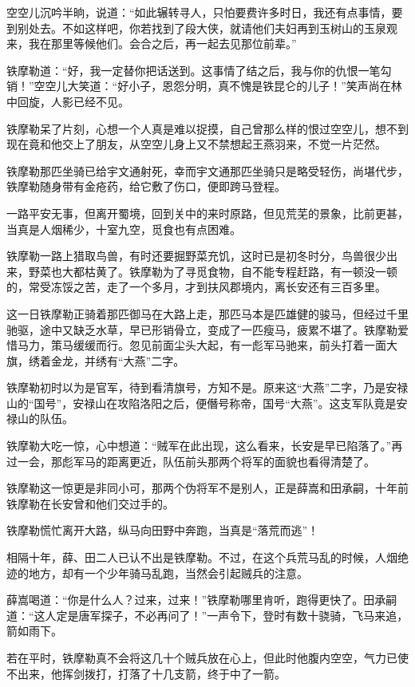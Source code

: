 \documentclass[12pt,oneside]{book}
\begin{document}
空空儿沉吟半晌，说道：``如此辗转寻人，只怕要费许多时日，我还有点事情，要到别处去。不如这样吧，你若找到了段大侠，就请他们夫妇再到玉树山的玉泉观来，我在那里等候他们。会合之后，再一起去见那位前辈。''

铁摩勒道：``好，我一定替你把话送到。这事情了结之后，我与你的仇恨一笔勾销！''空空儿大笑道：``好小子，恩怨分明，真不愧是铁昆仑的儿子！''笑声尚在林中回旋，人影已经不见。

铁摩勒呆了片刻，心想一个人真是难以捉摸，自己曾那么样的恨过空空儿，想不到现在竟和他交上了朋友，从空空儿身上又不禁想起王燕羽来，不觉一片茫然。

铁摩勒那匹坐骑已给宇文通射死，幸而宇文通那匹坐骑只是略受轻伤，尚堪代步，铁摩勒随身带有金疮药，给它敷了伤口，便即跨马登程。

一路平安无事，但离开蜀境，回到关中的来时原路，但见荒芜的景象，比前更甚，当真是人烟稀少，十室九空，觅食也有点困难。

铁摩勒一路上猎取鸟兽，有时还要掘野菜充饥，这时已是初冬时分，鸟兽很少出来，野菜也大都枯黄了。铁摩勒为了寻觅食物，自不能专程赶路，有一顿没一顿的，常受冻馁之苦，走了一个多月，才到扶风郡境内，离长安还有三百多里。

这一日铁摩勒正骑着那匹御马在大路上走，那匹马本是匹雄健的骏马，但经过千里驰驱，途中又缺乏水草，早已形销骨立，变成了一匹瘦马，疲累不堪了。铁摩勒爱惜马力，策马缓缓而行。忽见前面尘头大起，有一彪军马驰来，前头打着一面大旗，绣着金龙，并绣有``大燕''二字。

铁摩勒初时以为是官军，待到看清旗号，方知不是。原来这``大燕''二字，乃是安禄山的``国号''，安禄山在攻陷洛阳之后，便僭号称帝，国号``大燕''。这支军队竟是安禄山的队伍。

铁摩勒大吃一惊，心中想道：``贼军在此出现，这么看来，长安是早已陷落了。''再过一会，那彪军马的距离更近，队伍前头那两个将军的面貌也看得清楚了。

铁摩勒这一惊更是非同小可，那两个伪将军不是别人，正是薛嵩和田承嗣，十年前铁摩勒在长安曾和他们交过手的。

铁摩勒慌忙离开大路，纵马向田野中奔跑，当真是``落荒而逃''！

相隔十年，薛、田二人已认不出是铁摩勒。不过，在这个兵荒马乱的时候，人烟绝迹的地方，却有一个少年骑马乱跑，当然会引起贼兵的注意。

薛嵩喝道：``你是什么人？过来，过来！''铁摩勒哪里肯听，跑得更快了。田承嗣道：``这人定是唐军探子，不必再问了！''一声令下，登时有数十骁骑，飞马来追，箭如雨下。

若在平时，铁摩勒真不会将这几十个贼兵放在心上，但此时他腹内空空，气力已使不出来，他挥剑拨打，打落了十几支箭，终于中了一箭。
\end{document}

